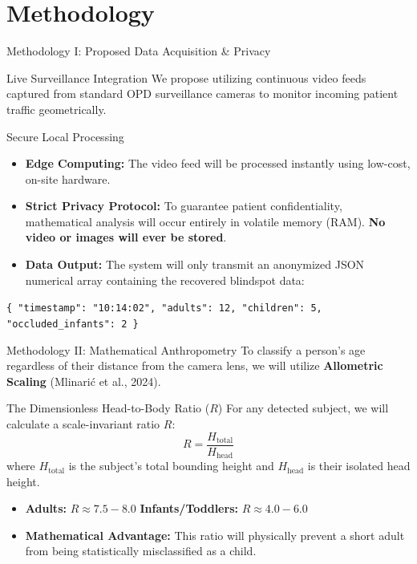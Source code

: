 \documentclass[11pt, aspectratio=169]{beamer}
\begin{document}
\section{Methodology}
\begin{frame}{Methodology I: Proposed Data Acquisition \& Privacy}
    \begin{block}{Live Surveillance Integration}
        We propose utilizing continuous video feeds captured from standard OPD surveillance cameras to monitor incoming patient traffic geometrically.
    \end{block}
    
    \vspace{0.2cm}
    \begin{block}{Secure Local Processing}
        \begin{itemize}
            \item \textbf{Edge Computing:} The video feed will be processed instantly using low-cost, on-site hardware.
            \item \textbf{Strict Privacy Protocol:} To guarantee patient confidentiality, mathematical analysis will occur entirely in volatile memory (RAM). \textbf{No video or images will ever be stored}.
            \item \textbf{Data Output:} The system will only transmit an anonymized JSON numerical array containing the recovered blindspot data:
        \end{itemize}
        \vspace{0.2cm}
        \centering \small \texttt{\{ "timestamp": "10:14:02", "adults": 12, "children": 5, "occluded\_infants": 2 \}}
    \end{block}
\end{frame}

\begin{frame}{Methodology II: Mathematical Anthropometry}
    To classify a person's age regardless of their distance from the camera lens, we will utilize \textbf{Allometric Scaling} (Mlinarić et al., 2024).

    \begin{block}{The Dimensionless Head-to-Body Ratio ($R$)}
        For any detected subject, we will calculate a scale-invariant ratio $R$:
        \begin {equation}R = \frac{H_{\text{total}}}{H_{\text{head}}}\end {equation}
        where $H_{\text{total}}$ is the subject's total bounding height and $H_{\text{head}}$ is their isolated head height.
    \end{block}

    \vspace{0.2cm}
    \begin{itemize}
        \item \textbf{Adults:} $R \approx 7.5 - 8.0$ \hspace{1cm} \textbf{Infants/Toddlers:} $R \approx 4.0 - 6.0$
        \item \textbf{Mathematical Advantage:} This ratio will physically prevent a short adult from being statistically misclassified as a child.
    \end{itemize}
\end{frame}
\end{document}
